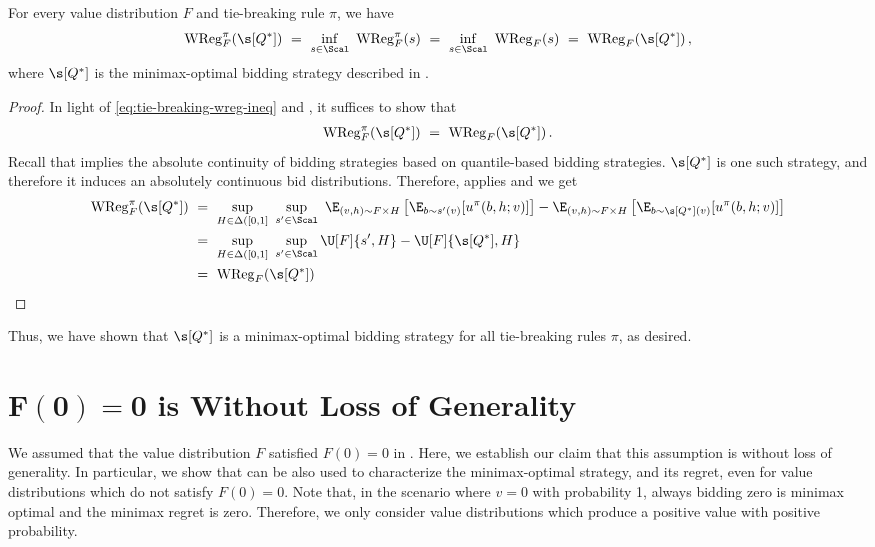 \begin{proposition}\label{prop:tie-breaking-wreg}
    For every value distribution $F$ and tie-breaking rule $\pi$, we have
    \begin{align*}
        \mathrm{WReg}^\pi_F(\s[Q^*])\ =\ \inf_{s \in \Scal}\  \mathrm{WReg}^\pi_F(s)\ =\  \inf_{s \in \Scal}\  \mathrm{WReg}_F(s)\ =\ \mathrm{WReg}_F(\s[Q^*])\,,
    \end{align*}
    where $\s[Q^*]$ is the minimax-optimal bidding strategy described in .
\end{proposition}
\begin{proof}
    In light of \eqref{eq:tie-breaking-wreg-ineq} and , it suffices to show that
    \begin{align*}
        \mathrm{WReg}^\pi_F(\s[Q^*])\ =\ \mathrm{WReg}_F(\s[Q^*])\,.
    \end{align*}
    Recall that  implies the absolute continuity of bidding strategies based on quantile-based bidding strategies. $\s[Q^*]$ is one such strategy, and therefore it induces an absolutely continuous bid distributions. Therefore,  applies and we get
    \begin{align*}
        \mathrm{WReg}^\pi_F(\s[Q^*])\ &=\ \sup_{H \in \Delta([0,1]}\ \sup_{s' \in \Scal}\ \E_{(v,h) \sim F \times H}\left[ \E_{b \sim s'(v)}[u^\pi(b,h;v)] \right] - \E_{(v,h) \sim F \times H}\left[ \E_{b \sim \s[Q^*](v)}[u^\pi(b,h;v)] \right]\\
        &=\ \sup_{H \in \Delta([0,1]}\  \sup_{s' \in \Scal} \U[F]{s', H} - \U[F]{\s[Q^*], H}\\
        &=\ \mathrm{WReg}_F(\s[Q^*]) \qedhere
    \end{align*}
\end{proof}

Thus, we have shown that $\s[Q^*]$ is a minimax-optimal bidding strategy for all tie-breaking rules $\pi$, as desired.



\section{$\mathbf{F(0) = 0}$ is Without Loss of Generality}\label{appendix:atom-at-0}

We  assumed that the value distribution $F$ satisfied $F(0) = 0$ in . Here, we establish our claim that this assumption is without loss of generality. In particular, we show that  can be also used to characterize the minimax-optimal strategy, and its regret, even for value distributions which do not satisfy $F(0) = 0$. Note that, in the scenario where $v = 0$ with probability 1, always bidding zero is minimax optimal and the minimax regret is zero. Therefore, we only consider value distributions which produce a positive value with positive probability.



